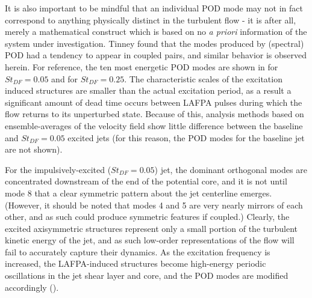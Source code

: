 It is also important to be mindful that an individual POD mode may not in fact correspond to anything physically distinct in the turbulent flow - it is after all, merely a mathematical construct which is based on no \textit{a priori} information of the system under investigation.
Tinney \etal \citep{Tinney2008b} found that the modes produced by (spectral) POD had a tendency to appear in coupled pairs, and similar behavior is observed herein. 
For reference, the ten most energetic POD modes are shown in  for $St_{DF} = 0.05$ and  for $St_{DF} = 0.25$.
The characteristic scales of the excitation induced structures are smaller than the actual excitation period, as a result a significant amount of dead time occurs between LAFPA pulses during which the flow returns to its unperturbed state.
Because of this, analysis methods based on ensemble-averages of the velocity field show little difference between the baseline and $St_{DF} = 0.05$ excited jets (for this reason, the POD modes for the baseline jet are not shown).

For the impulsively-excited ($St_{DF} = 0.05$) jet, the dominant orthogonal modes are concentrated downstream of the end of the potential core, and it is not until mode 8 that a clear symmetric pattern about the jet centerline emerges. 
(However, it should be noted that modes 4 and 5 are very nearly mirrors of each other, and as such could produce symmetric features if coupled.)
Clearly, the excited axisymmetric structures represent only a small portion of the turbulent kinetic energy of the jet, and as such low-order representations of the flow will fail to accurately capture their dynamics.
As the excitation frequency is increased, the LAFPA-induced structures become high-energy periodic oscillations in the jet shear layer and core, and the POD modes are modified accordingly ().

